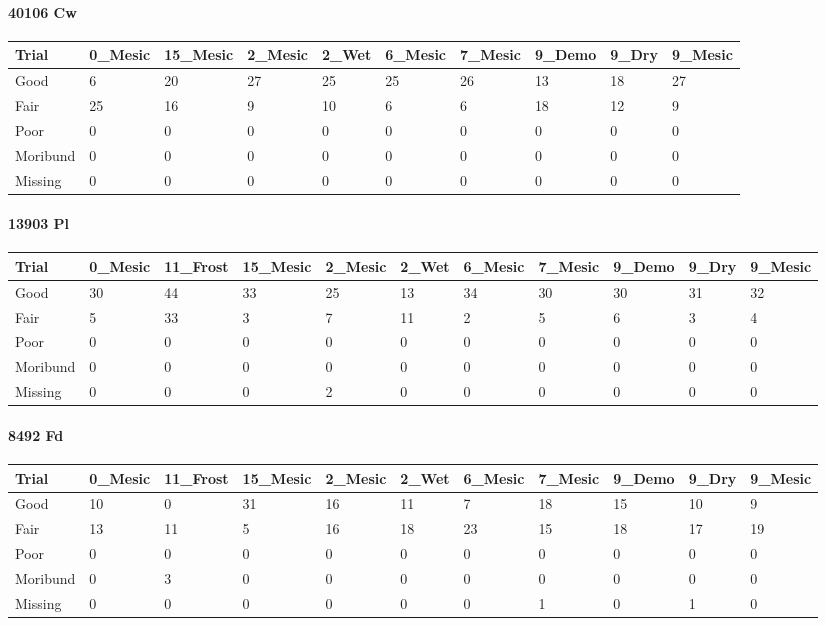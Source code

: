 \documentclass[
]{article}
\begin{document}
\hypertarget{cw-1}{%
\paragraph{40106 Cw}\label{cw-1}}

\begin{tabular}{l|l|l|l|l|l|l|l|l|l}
\hline
Trial & 0\_Mesic & 15\_Mesic & 2\_Mesic & 2\_Wet & 6\_Mesic & 7\_Mesic & 9\_Demo & 9\_Dry & 9\_Mesic\\
\hline
Good & 6 & 20 & 27 & 25 & 25 & 26 & 13 & 18 & 27\\
\hline
Fair & 25 & 16 & 9 & 10 & 6 & 6 & 18 & 12 & 9\\
\hline
Poor & 0 & 0 & 0 & 0 & 0 & 0 & 0 & 0 & 0\\
\hline
Moribund & 0 & 0 & 0 & 0 & 0 & 0 & 0 & 0 & 0\\
\hline
Missing & 0 & 0 & 0 & 0 & 0 & 0 & 0 & 0 & 0\\
\hline
\end{tabular}

\hypertarget{pl-3}{%
\paragraph{13903 Pl}\label{pl-3}}

\begin{tabular}{l|l|l|l|l|l|l|l|l|l|l}
\hline
Trial & 0\_Mesic & 11\_Frost & 15\_Mesic & 2\_Mesic & 2\_Wet & 6\_Mesic & 7\_Mesic & 9\_Demo & 9\_Dry & 9\_Mesic\\
\hline
Good & 30 & 44 & 33 & 25 & 13 & 34 & 30 & 30 & 31 & 32\\
\hline
Fair & 5 & 33 & 3 & 7 & 11 & 2 & 5 & 6 & 3 & 4\\
\hline
Poor & 0 & 0 & 0 & 0 & 0 & 0 & 0 & 0 & 0 & 0\\
\hline
Moribund & 0 & 0 & 0 & 0 & 0 & 0 & 0 & 0 & 0 & 0\\
\hline
Missing & 0 & 0 & 0 & 2 & 0 & 0 & 0 & 0 & 0 & 0\\
\hline
\end{tabular}

\hypertarget{fd-3}{%
\paragraph{8492 Fd}\label{fd-3}}

\begin{tabular}{l|l|l|l|l|l|l|l|l|l|l}
\hline
Trial & 0\_Mesic & 11\_Frost & 15\_Mesic & 2\_Mesic & 2\_Wet & 6\_Mesic & 7\_Mesic & 9\_Demo & 9\_Dry & 9\_Mesic\\
\hline
Good & 10 & 0 & 31 & 16 & 11 & 7 & 18 & 15 & 10 & 9\\
\hline
Fair & 13 & 11 & 5 & 16 & 18 & 23 & 15 & 18 & 17 & 19\\
\hline
Poor & 0 & 0 & 0 & 0 & 0 & 0 & 0 & 0 & 0 & 0\\
\hline
Moribund & 0 & 3 & 0 & 0 & 0 & 0 & 0 & 0 & 0 & 0\\
\hline
Missing & 0 & 0 & 0 & 0 & 0 & 0 & 1 & 0 & 1 & 0\\
\hline
\end{tabular}
\end{document}
